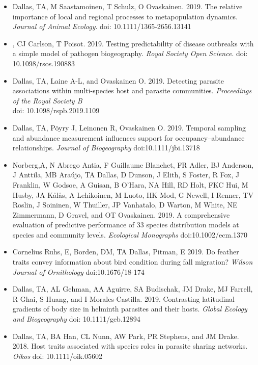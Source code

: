 \documentclass[]{CV}
\begin{document}
{}

\begin{itemize}

	\item {\mefont Dallas, TA},  M Saastamoinen, T Schulz, O Ovaskainen. 2019. The relative importance of local and regional processes to metapopulation dynamics. \textit{Journal of Animal Ecology}. doi: 10.1111/1365-2656.13141 

	\item {}, CJ Carlson, T Poisot. 2019. Testing predictability of disease outbreaks with a simple model of pathogen biogeography. \textit{Royal Society Open Science}. doi: 10.1098/rsos.190883

	\item {\mefont Dallas, TA}, Laine A-L, and Ovaskainen O. 2019. Detecting parasite associations within multi-species host and parasite communities. \textit{Proceedings of the Royal Society B} \\ doi: 10.1098/rspb.2019.1109

	\item {\mefont Dallas, TA}, P{\"o}yry J, Leinonen R, Ovaskainen O. 2019. Temporal sampling and abundance measurement influences support for occupancy–abundance relationships. \textit{Journal of Biogeography} doi:10.1111/jbi.13718​

  \item Norberg,A, N Abrego Antia, F Guillaume Blanchet, FR Adler, BJ Anderson, J Anttila, MB Araújo, {\mefont TA Dallas}, D Dunson, J Elith, S Foster, R Fox, J Franklin, W Godsoe, A Guisan, B O'Hara, NA Hill, RD Holt, FKC Hui, M Husby, JA Kålås, A Lehikoinen, M Luoto, HK Mod, G Newell, I Renner, TV Roslin, J Soininen, W Thuiller, JP Vanhatalo, D Warton, M White, NE Zimmermann, D Gravel, and OT Ovaskainen. 2019. A comprehensive evaluation of predictive performance of 33 species distribution models at species and community levels. \textit{Ecological Monographs} doi:10.1002/ecm.1370
    
  \item Cornelius Ruhs, E, Borden, DM, {\mefont TA Dallas}, Pitman, E 2019. Do feather traits convey information about bird condition during fall migration? \textit{Wilson Journal of Ornithology} doi:10.1676/18-174

  \item {\mefont Dallas, TA}, AL Gehman, AA Aguirre, SA Budischak, JM Drake, MJ Farrell, R Ghai, S Huang, and I Morales-Castilla. 2019. Contrasting latitudinal gradients of body size in helminth parasites and their hosts. \textit{Global Ecology and Biogeography} doi: 10.1111/geb.12894

\item {\mefont Dallas, TA}, BA Han, CL Nunn, AW Park, PR Stephens, and JM Drake. 2018. Host traits associated with species roles in parasite sharing networks. \textit{Oikos} doi: 10.1111/oik.05602
 
\end{itemize}
\end{document}
